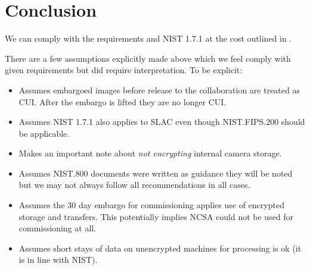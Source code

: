 \section{Conclusion}\label{sec:conc}
We can comply with the requirements and NIST 1.7.1 at the cost outlined in .

There are a few assumptions explicitly made above which we feel comply with given requirements but did require interpretation. To be explicit:
\begin{itemize}
\item {} Assumes embargoed images before release to the collaboration are treated as CUI. After the embargo is lifted they are no longer CUI.
\item {} Assumes NIST 1.7.1 also applies to SLAC even though NIST.FIPS.200 should be applicable.
\item {} Makes an important note about \emph{not encrypting} internal camera storage.
\item {} Assumes NIST.800 documents were written as guidance  they will be noted but we may not always follow all recommendations in all cases.
\item {} Assumes the 30 day embargo for commissioning applies use of encrypted storage and transfers. This potentially implies NCSA could not be used for commissioning at all.
\item {} Assumes short stays of data on unencrypted machines for processing is ok (it is in line with NIST).

\end{itemize}
